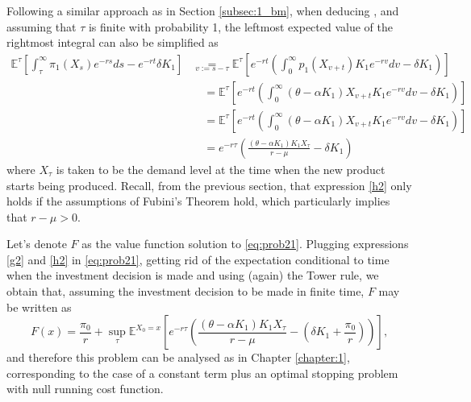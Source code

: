 Following a similar approach as in Section \ref{subsec:1_bm}, when deducing , and assuming that $\tau$ is finite with probability 1, the leftmost expected value of the rightmost integral can also be simplified as
\begin{align}
\mathds{E}^{\tau} \left[  \int_\tau^\infty \pi_1(X_s)e^{-rs} ds -e^{-rt}\delta K_1 \right]
&\underset{v:=s-\tau}{=}  \mathds{E}^{\tau} \left[  e^{-rt} \left( \int_0^\infty p_1(X_{v+t}) K_1e^{-rv} dv -\delta K_1 \right) \right] \nonumber \\
& \quad = \mathds{E}^{\tau} \left[ e^{-rt} \left( \int_0^\infty (\theta-\alpha K_1)X_{v+t} K_1e^{-rv} dv -\delta K_1 \right) \right] \nonumber \\
& \quad = \mathds{E}^{\tau} \left[ e^{-rt} \left( \int_0^\infty (\theta-\alpha K_1)X_{v+t} K_1e^{-rv} dv -\delta K_1 \right) \right] \nonumber \\
& \quad = e^{-r\tau} \left( \frac{(\theta-\alpha K_1)K_1 X_\tau}{r-\mu} -\delta K_1 \right)
\label{h2}
\end{align}
where $X_\tau$ is taken to be the demand level at the time when the new product starts being produced. Recall, from the previous section, that expression \eqref{h2} only holds if the assumptions of Fubini's Theorem hold, which particularly implies that $r-\mu>0$.

Let's denote $F$ as the value function solution to \eqref{eq:prob21}. Plugging expressions \eqref{g2} and \eqref{h2} in \eqref{eq:prob21}, getting rid of the expectation conditional to time when the investment decision is made and using (again) the Tower rule, we obtain that, assuming the investment decision to be made in finite time, $F$ may be written as
\begin{equation}
F(x)=\frac{\pi_0}{r}+ \sup _\tau \mathds{E}^{X_0=x} \left[ e^{-r\tau}\left(\frac{(\theta-\alpha K_1)K_1 X_\tau}{r-\mu} - \left( \delta K_1  +\frac{\pi_0}{r}\right)  \right) \right],
\label{prob235}
\end{equation}
and therefore this problem can be analysed as in Chapter \ref{chapter:1}, corresponding to the case of a constant term plus an optimal stopping problem with null running cost function. 

